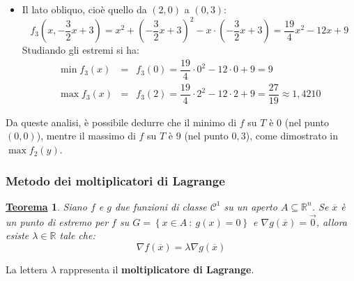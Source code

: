 \documentclass[a4paper]{article}
\newtheorem{theorem}{\textcolor{Red3}{\underline{Teorema}}}
\newcommand{\definition}[1]{\textcolor{Red3}{\textbf{#1}}}
\begin{document}
\begin{itemize}
		\item Il lato obliquo, cioè quello da $\left(2,0\right)$ a $\left(0,3\right)$:
		\begin{equation*}
			f_{3}\left(x, -\dfrac{3}{2}x + 3\right) = x^{2} +\left(-\dfrac{3}{2}x + 3\right)^{2} - x \cdot \left(-\dfrac{3}{2}x + 3\right) = \dfrac{19}{4}x^{2} - 12x + 9
		\end{equation*}
		Studiando gli estremi si ha:
		\begin{equation*}
			\begin{array}{rcl}
				\min f_{3}\left(x\right) &=& f_{3}\left(0\right) = \dfrac{19}{4} \cdot 0^{2} - 12 \cdot 0 + 9 = 9 \\ [.5em]
				\max f_{3}\left(x\right) &=& f_{3}\left(2\right) = \dfrac{19}{4} \cdot  2^{2} - 12 \cdot 2 + 9 = \dfrac{27}{19} \approx 1,4210
			\end{array}
		\end{equation*}
	\end{itemize}
	Da queste analisi, è possibile dedurre che il minimo di $f$ su $T$ è $0$ (nel punto $\left(0,0\right)$), mentre il massimo di $f$ su $T$ è $9$ (nel punto $0,3$), come dimostrato in $\max f_{2}\left(y\right)$.\newpage

	\subsubsection{Metodo dei moltiplicatori di Lagrange}\label{subsubsection: metodo dei moltiplicatori di Lagrange}

	\begin{theorem}
		Siano $f$ e $g$ due funzioni di classe $\mathcal{C}^{1}$ su un aperto $A \subseteq \mathbb{R}^{n}$. Se $\overline{x}$ è un punto di estremo per $f$ su $G = \left\{x \in A \: : \: g\left(x\right)=0\right\}$ e $\nabla g\left(\overline{x}\right) = \overrightarrow{0}$, allora esiste $\lambda \in \mathbb{R}$ tale che:
		\begin{equation*}
			\nabla f\left(\overline{x}\right) = \lambda \nabla g\left(\overline{x}\right)
		\end{equation*}
	\end{theorem}

	\noindent
	La lettera $\lambda$ rappresenta il \definition{moltiplicatore di Lagrange}.\newline
\end{document}

